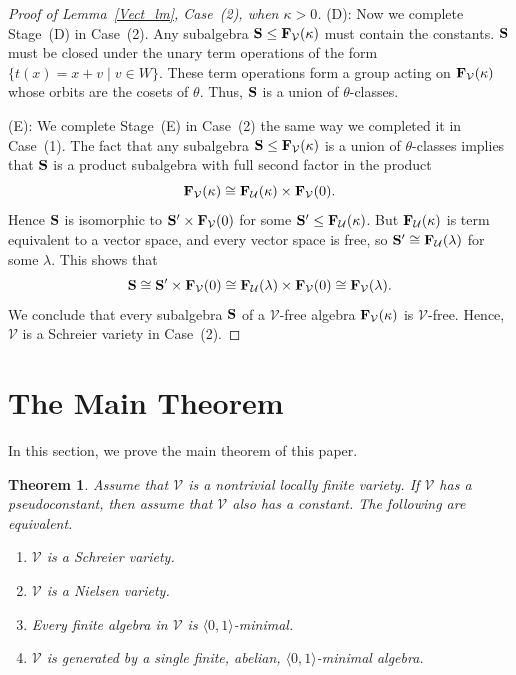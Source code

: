 \documentclass[12pt]{amsart}
\newtheorem{thm}{Theorem}[section] %
\theoremstyle{definition}
\numberwithin{equation}{section}
\newcommand{\m}[1]{{\mathbf{\uppercase{#1}}}}
\begin{document}
\begin{proof}[Proof of Lemma~\ref{Vect_lm}, Case~(2), when $\kappa>0$]
(D): Now we complete Stage~(D) in Case~(2).
Any subalgebra $\m s\leq \m f_{\mathcal{V}}(\kappa)$
must contain the constants.
$\m s$ must be closed under the unary term
operations of the form $\{t(x) = x+v\;|\;v\in W\}$.
These term operations form a group acting
on $\m f_{\mathcal{V}}(\kappa)$ whose orbits 
are the cosets of $\theta$. Thus, $\m s$
is a union of $\theta$-classes.

(E): We complete Stage~(E) in Case~(2) the same way we completed
it in Case~(1). The fact that any subalgebra
$\m s\leq \m f_{\mathcal{V}}(\kappa)$
is a union of $\theta$-classes implies that
$\m s$ is a product subalgebra
with full second factor in the product
\[
\m f_{\mathcal{V}}(\kappa)\cong 
\m f_{\mathcal{U}}(\kappa)\times
\m f_{\mathcal{V}}(0).
\]
Hence
$\m s$ is isomorphic to $\m s'\times \m f_{\mathcal{V}}(0)$
for some $\m s'\leq \m f_{\mathcal{U}}(\kappa)$.
But $\m f_{\mathcal{U}}(\kappa)$ is term equivalent
to a vector space, and every vector space is
free, so $\m s'\cong \m f_{\mathcal{U}}(\lambda)$ for some
$\lambda$. This shows that 
\[
\m s\cong \m s'\times \m f_{\mathcal{V}}(0)\cong 
\m f_{\mathcal{U}}(\lambda)\times
\m f_{\mathcal{V}}(0)\cong
\m f_{\mathcal{V}}(\lambda).
\]
We conclude that every subalgebra $\m s$
of a $\mathcal{V}$-free
algebra $\m f_{\mathcal{V}}(\kappa)$
is $\mathcal{V}$-free. Hence,
$\mathcal{V}$ is a Schreier variety in Case~(2).
\end{proof}


\section{The Main Theorem} \label{main}

In this section, we prove the main theorem of this paper.

\begin{thm} \label{main_thm}
  Assume that $\mathcal V$ is a nontrivial
  locally finite variety.
  If $\mathcal V$ has a pseudoconstant, then
  assume that $\mathcal V$ also has a
  constant. 
The following are equivalent.
\begin{enumerate}
\item $\mathcal V$ is a Schreier variety.
  \smallskip
  
\item $\mathcal V$ is a Nielsen variety.
  \smallskip

\item Every finite
  algebra in $\mathcal V$ is $\langle 0,1\rangle$-minimal.
  \smallskip

\item $\mathcal V$ is generated by a single
  finite, abelian, $\langle 0,1\rangle$-minimal
  algebra.
\end{enumerate}
\end{thm}
\end{document}

